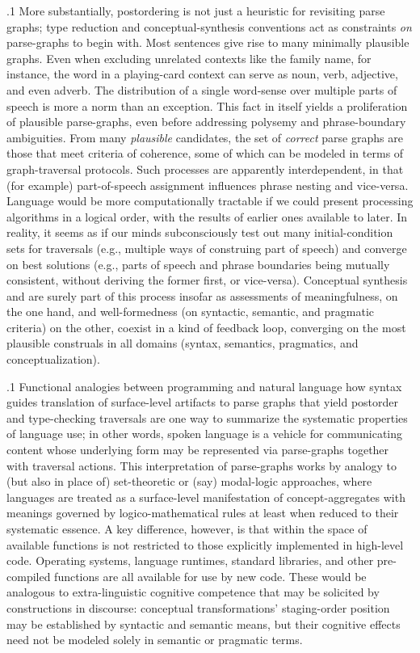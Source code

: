 \documentclass[11pt, twocolumn]{article}
\begin{document}
\p.1{%
More substantially, postordering is not just a heuristic
for revisiting parse graphs; type reduction and
conceptual-synthesis conventions act as constraints
\textit{on} parse-graphs to begin with.  Most sentences give rise
to many minimally plausible graphs.  Even when excluding
unrelated contexts like the family name, for instance, the
word  in a playing-card context can serve as noun,
verb, adjective, and even adverb.  The distribution of a
single word-sense over multiple parts of speech is more a
norm than an exception.  This fact in itself yields a proliferation
of plausible parse-graphs, even before addressing polysemy and
phrase-boundary ambiguities.  From many \textit{plausible} candidates,
the set of \textit{correct} parse graphs are those that meet
criteria of coherence, some of which can be modeled in terms
of graph-traversal protocols.
Such processes are apparently interdependent, in that (for example)
part-of-speech assignment influences phrase nesting and vice-versa.
Language would be more computationally tractable if we could
present processing algorithms in a logical order, with the
results of earlier ones available to later.  In reality,
it seems as if our minds subconsciously test out many
initial-condition sets for traversals (e.g., multiple ways
of construing part of speech) and converge on best solutions
(e.g., parts of speech and phrase boundaries
being mutually consistent, without deriving the former first,
or vice-versa).  Conceptual synthesis and  are
surely part of this process insofar as assessments of meaningfulness, on the
one hand, and well-formedness (on syntactic, semantic, and pragmatic criteria)
on the other, coexist in a kind of feedback loop, converging on the most plausible
construals in all domains (syntax, semantics, pragmatics, and conceptualization).
} %

\p.1{%
Functional analogies between programming and natural
language \mdash{} how syntax guides translation of
surface-level artifacts to parse graphs that yield
postorder and type-checking traversals \mdash{} are
one way to summarize the systematic properties
of language use; in other words, spoken
language is a vehicle for communicating content
whose underlying form may be represented
via parse-graphs together with traversal actions.
This interpretation
of parse-graphs works by analogy to
(but also in place of) set-theoretic or (say) modal-logic
approaches, where languages are treated as a surface-level
manifestation of concept-aggregates with meanings
governed by logico-mathematical rules
\mdash{} at least when reduced to their systematic essence.  A key difference,
however, is that within  the space
of available functions is not restricted to those explicitly
implemented in high-level code.  Operating systems,
language runtimes, standard libraries, and other
pre-compiled functions are all available for use by new
code.  These would be analogous to extra-linguistic
cognitive competence that may be solicited by constructions
in discourse: conceptual transformations' staging-order position
may be established by syntactic and
semantic means, but their cognitive effects need not be
modeled solely in semantic or pragmatic terms.
} %
\end{document}
